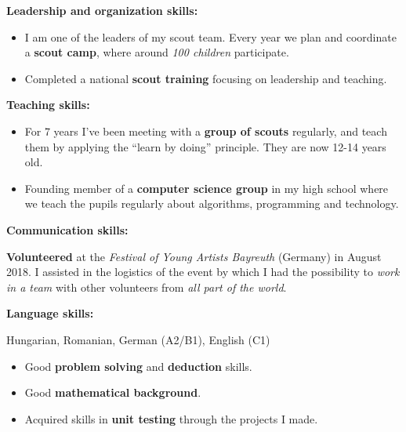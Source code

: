 
\textbf{Leadership and organization skills:} 

\begin{itemize}
\item I am one of the leaders of my scout team. Every year we plan and coordinate a \textbf{scout camp}, where around \textit{100 children} participate.

\item Completed a national \textbf{scout training} focusing on leadership and teaching.
\end{itemize}

\divider

\textbf{Teaching skills:} 

\begin{itemize}
 \item For 7 years I've been meeting with a \textbf{group of scouts} regularly, and teach them by applying the ``learn by doing'' principle. They are now 12-14 years old.
 
 \item Founding member of a \textbf{computer science group} in my high school where we teach the pupils regularly about algorithms, programming and technology.
\end{itemize}

\divider

\textbf{Communication skills:} 

\textbf{Volunteered} at the \textit{Festival of Young Artists Bayreuth} (Germany) in August 2018. I assisted in the logistics of the event by which I had the possibility to \textit{work in a team} with other volunteers from \textit{all part of the world}.

\divider

\textbf{Language skills:} 

Hungarian, Romanian, German (A2/B1), English (C1)



\smallskip


\begin{itemize}

\item Good \textbf{problem solving} and \textbf{deduction} skills.

\item Good \textbf{mathematical background}.

\item Acquired skills in \textbf{unit testing} through the projects I made.

\end{itemize}


